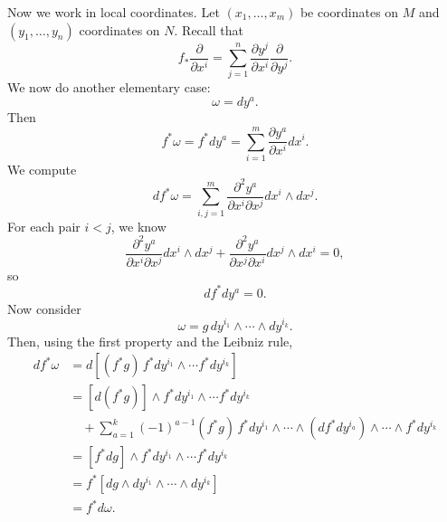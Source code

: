 \documentclass{ximera}
\begin{document}
\begin{solution}
Now we work in local coordinates. Let $(x_1, \ldots , x_m)$ be coordinates on $M$ and $(y_1, \ldots , y_n)$ coordinates on $N$. Recall that 
\[      f_{\ast} \frac{\partial }{\partial x ^i } = \sum_{j  = 1 } ^n \frac{\partial y ^j}{\partial x ^i} \frac{\partial }{\partial y ^j}.                       \]
We now do another elementary case:
\[     \omega =   dy^a .     \]
Then 
\[     f^{\ast} \omega =  f^{\ast} dy^a =     \sum_{i  = 1 } ^m \frac{\partial y ^a}{\partial x ^i}  d x ^i.                  \]
We compute
\[      df ^{\ast} \omega = \sum _{i,j = 1}^m \frac{\partial ^2 y ^a}{\partial x^i \partial x ^j }  dx^i \wedge dx^j .                    \]
For each pair $i < j$, we know
\[   \frac{\partial ^2 y ^a}{\partial x^i \partial x ^j } dx^i \wedge dx^j +  \frac{\partial ^2 y ^a}{\partial x^j \partial x ^i } dx^j \wedge dx^i = 0 ,  \]
so 
\[      df ^{\ast} d y ^a = 0 .     \]
Now consider 
\[     \omega = g  \, dy ^{i_1} \wedge \cdots \wedge dy ^{i_k}  .       \]
Then, using the first property and the Leibniz rule, 
\begin{align*}
    d f^{\ast} \omega & =  d  [ ( f^{\ast}g )  \, f^{\ast }dy^{i_1} \wedge \cdots f^{\ast} dy ^{i_k}] \\
    & = [ d( f^{\ast}g ) ] \wedge f^{\ast }dy^{i_1} \wedge \cdots f^{\ast} dy ^{i_k} \\
    & \,\,\,\,\,\, + \sum _{a = 1 }^k (-1 ) ^{a-1} (f^{\ast}g) \, f^{\ast} dy^{i_1 } \wedge \cdots \wedge (df ^{\ast} dy ^{i_a} ) \wedge \cdots \wedge f^{\ast} dy^{i_k} \\
    & = [ f^{\ast} dg ] \wedge f^{\ast }dy^{i_1} \wedge \cdots f^{\ast} dy ^{i_k} \\
    & = f^{\ast} [  d  g \wedge dy^{i_1} \wedge \cdots \wedge dy ^{i_k}  ] \\
    & = f ^{\ast} d \omega . 
\end{align*}
        
    \end{solution}

    
\end{document}
